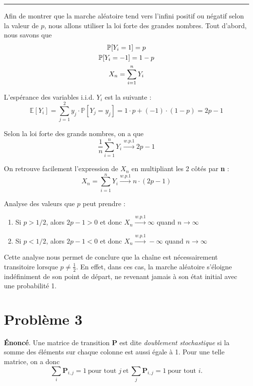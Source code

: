 \documentclass{article}
\begin{document}
    \vspace{.5cm}
    \hrule
    \vspace{.5cm}

    Afin de montrer que la marche aléatoire tend vers l'infini positif ou négatif selon la valeur de $p$, nous allons utiliser la loi forte des grandes nombres. Tout d'abord, nous savons que
    \begin{gather}
        \mathbb{P}[Y_i = 1] = p \notag \\
        \mathbb{P}[Y_i = -1] = 1 - p \notag \\
        X_n = \sum^n_{i = 1} Y_i \notag
    \end{gather}

    L'espérance des variables i.i.d. $Y_i$ est la suivante :
    \[
        \mathbb{E}[Y_i] = \sum^2_{j = 1} y_j \cdot \mathbb{P}[Y_j = y_j] = 1 \cdot p + (-1) \cdot (1 - p) = 2p - 1
    \]

    Selon la loi forte des grands nombres, on a que
    \[
        \frac{1}{n} \sum^n_{i = 1} Y_i \stackrel{w.p.1}{\to} 2p - 1
    \]

    On retrouve facilement l'expression de $X_n$ en multipliant les 2 côtés par \textbf{n} :
    \[
        X_n = \sum^n_{i = 1} Y_i \stackrel{w.p.1}{\to} n \cdot (2p - 1)
    \]

    Analyse des valeurs que $p$ peut prendre :
    \begin{enumerate}[label=\alph*), left=.8cm]
        \item Si \(p > 1/2\), alors \(2p - 1 > 0\) et donc \(X_n \stackrel{w.p.1}{\to} \infty\) quand \(n\to\infty\)
        \item Si \(p < 1/2\), alors \(2p - 1 < 0\) et donc \(X_n \stackrel{w.p.1}{\to} -\infty\) quand \(n\to\infty\)
    \end{enumerate}

    \vspace{.2cm}
    Cette analyse nous permet de conclure que la chaîne est nécessairement transitoire lorsque $p \neq \frac{1}{2}$. En effet, dans ces cas, la marche aléatoire s'éloigne indéfiniment de son point de départ, ne revenant jamais à son état initial avec une probabilité 1.

\section*{Problème 3}
    \textbf{Énoncé}. Une matrice de transition $\boldsymbol{P}$ est dite \textit{doublement stochastique} si la somme des éléments sur chaque colonne est aussi égale à 1. Pour une telle matrice, on a donc
    \[
        \sum_i \boldsymbol{P}_{i,j} = 1\ \text{pour tout } j\ \text{et}\ \sum_j \boldsymbol{P}_{i,j} = 1\ \text{pour tout } i.
    \]  
\end{document}
